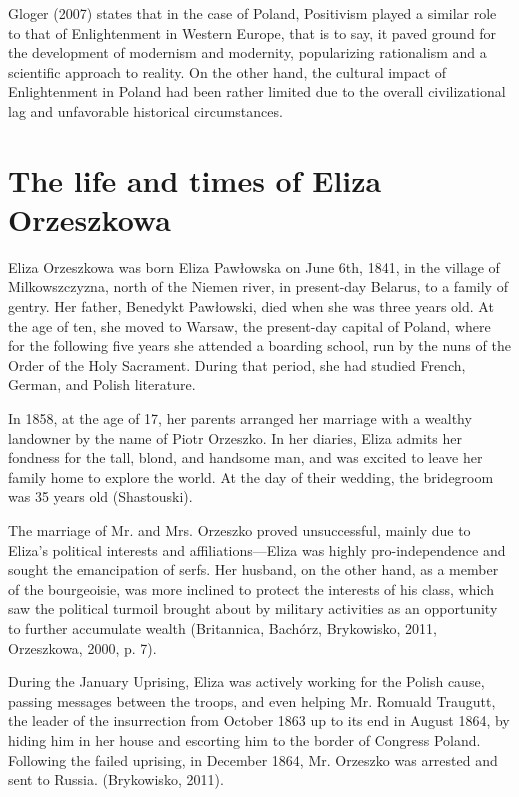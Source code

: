 Gloger (2007) states that in the case of Poland, Positivism played a similar role to that of Enlightenment in Western Europe, that is to say, it paved ground for the development of modernism and modernity, popularizing rationalism and a scientific approach to reality. On the other hand, the cultural impact of Enlightenment in Poland had been rather limited due to the overall civilizational lag and unfavorable historical circumstances.

\section{The life and times of Eliza Orzeszkowa}

Eliza Orzeszkowa was born Eliza Pawłowska on June 6th, 1841, in the village of Milkowszczyzna, north of the Niemen river, in present-day Belarus, to a family of gentry.
Her father, Benedykt Pawłowski, died when she was three years old. 
At the age of ten, she moved to Warsaw, the present-day capital of Poland, where for the following five years she attended a boarding school, run by the nuns of the Order of the Holy Sacrament.
During that period, she had studied French, German, and Polish literature.

In 1858, at the age of 17, her parents arranged her marriage with a wealthy landowner by the name of Piotr Orzeszko.
In her diaries, Eliza admits her fondness for the tall, blond, and handsome man, and was excited to leave her family home to explore the world.
At the day of their wedding, the bridegroom was 35 years old
(Shastouski).


The marriage of Mr. and Mrs. Orzeszko proved unsuccessful, mainly due to Eliza's political interests and affiliations---Eliza was highly pro-independence and sought the emancipation of serfs.
Her husband, on the other hand, as a member of the bourgeoisie, was more inclined to protect the interests of his class, which saw the political turmoil brought about by military activities as an opportunity to further accumulate wealth
(Britannica, Bachórz, Brykowisko, 2011, Orzeszkowa, 2000, p. 7).


During the January Uprising, Eliza was actively working for the Polish cause, passing messages between the troops, and even helping Mr. Romuald Traugutt, the leader of the insurrection from October 1863 up to its end in August 1864, by hiding him in her house and escorting him to the border of Congress Poland.
Following the failed uprising, in December 1864, Mr. Orzeszko was arrested and sent to Russia.
(Brykowisko, 2011).

